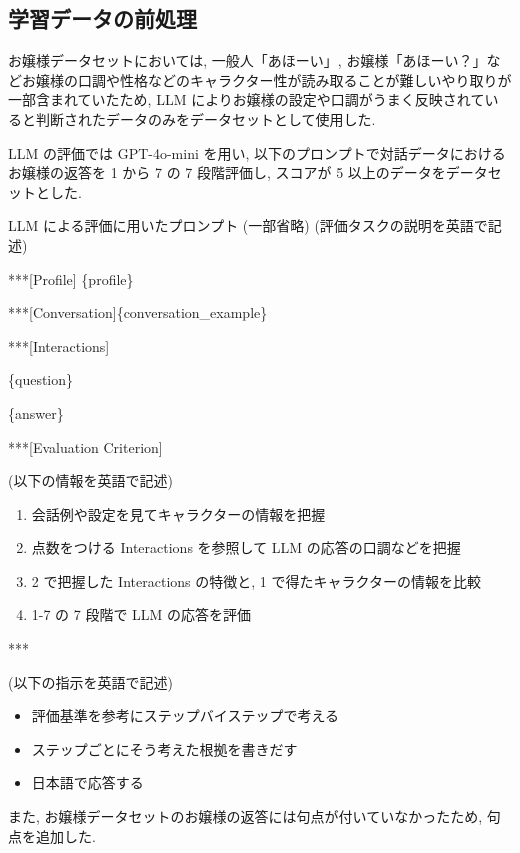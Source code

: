 \documentclass[twocolumn]{jarticle}
\begin{document}
\subsection{学習データの前処理}
お嬢様データセットにおいては, 一般人「あほーい」, お嬢様「あほーい？」などお嬢様の口調や性格などのキャラクター性が読み取ることが難しいやり取りが一部含まれていたため, LLM によりお嬢様の設定や口調がうまく反映されていると判断されたデータのみをデータセットとして使用した. \par
LLM の評価では GPT-4o-mini を用い, 以下のプロンプトで対話データにおけるお嬢様の返答を 1 から 7 の 7 段階評価し, スコアが 5 以上のデータをデータセットとした.
\begin{itembox}[l]{LLM による評価に用いたプロンプト (一部省略)}
\small
(評価タスクの説明を英語で記述)\par
***[Profile]
\{profile\}\par
***[Conversation]\{conversation\_example\}\par
***[Interactions]\par
[user]\{question\}\par
\par
[assistant]\{answer\}\par
***[Evaluation Criterion]\par
(以下の情報を英語で記述)\par
\begin{enumerate}
\small
    \item  会話例や設定を見てキャラクターの情報を把握
    \item 点数をつける Interactions を参照して LLM の応答の口調などを把握
    \item 2 で把握した Interactions の特徴と, 1 で得たキャラクターの情報を比較
    \item 1-7 の 7 段階で LLM の応答を評価
\end{enumerate}

***\par
(以下の指示を英語で記述)
\begin{itemize}
\small
    \item 評価基準を参考にステップバイステップで考える
    \item ステップごとにそう考えた根拠を書きだす
    \item 日本語で応答する
\end{itemize}
\end{itembox}
また, お嬢様データセットのお嬢様の返答には句点が付いていなかったため, 句点を追加した. 
\end{document}
